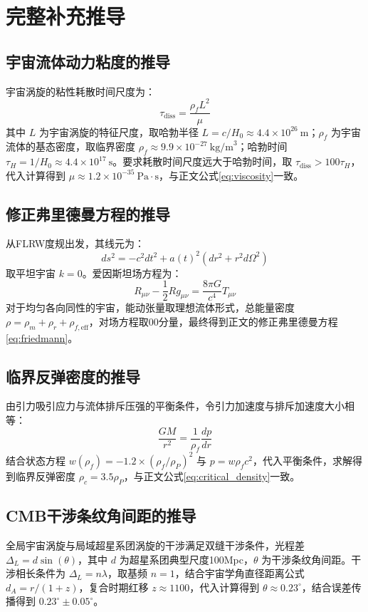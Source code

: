 \documentclass[aps,prd,preprint,superscriptaddress,floatfix,numbers,sort&compress]{revtex4-2}
\begin{document}
\section{完整补充推导}
\subsection{宇宙流体动力粘度的推导}
宇宙涡旋的粘性耗散时间尺度为：
$$\tau_{\text{diss}}=\frac{\rho_{f} L^{2}}{\mu}$$
其中 $L$ 为宇宙涡旋的特征尺度，取哈勃半径 $L=c / H_{0} \approx 4.4 \times 10^{26} \ \text{m}$；$\rho_{f}$ 为宇宙流体的基态密度，取临界密度 $\rho_{f} \approx 9.9 \times 10^{-27} \ \text{kg/m}^3$；哈勃时间 $\tau_{H}=1 / H_{0} \approx 4.4 \times 10^{17} \ \text{s}$。要求耗散时间尺度远大于哈勃时间，取 $\tau_{\text{diss}}>100 \tau_{H}$，代入计算得到 $\mu \approx 1.2 \times 10^{-35} \ \text{Pa} \cdot \text{s}$，与正文公式\eqref{eq:viscosity}一致。

\subsection{修正弗里德曼方程的推导}
从FLRW度规出发，其线元为：
$$ds^{2}=-c^{2} d t^{2}+a(t)^{2}(d r^{2}+r^{2} d \Omega^{2})$$
取平坦宇宙 $k=0$。爱因斯坦场方程为：
$$R_{\mu \nu}-\frac{1}{2} R g_{\mu \nu}=\frac{8 \pi G}{c^{4}} T_{\mu \nu}$$
对于均匀各向同性的宇宙，能动张量取理想流体形式，总能量密度 $\rho=\rho_{m}+\rho_{r}+\rho_{f, \mathrm{eff}}$，对场方程取00分量，最终得到正文的修正弗里德曼方程\eqref{eq:friedmann}。

\subsection{临界反弹密度的推导}
由引力吸引应力与流体排斥压强的平衡条件，令引力加速度与排斥加速度大小相等：
$$\frac{G M}{r^{2}}=\frac{1}{\rho_{f}} \frac{d p}{d r}$$
结合状态方程 $w(\rho_{f})=-1.2 \times(\rho_{f} / \rho_{P})^{2}$ 与 $p=w \rho_{f} c^{2}$，代入平衡条件，求解得到临界反弹密度 $\rho_{c}=3.5 \rho_{P}$，与正文公式\eqref{eq:critical_density}一致。

\subsection{CMB干涉条纹角间距的推导}
全局宇宙涡旋与局域超星系团涡旋的干涉满足双缝干涉条件，光程差 $\Delta_{L}=d \sin (\theta)$，其中 $d$ 为超星系团典型尺度100Mpc，$\theta$ 为干涉条纹角间距。干涉相长条件为 $\Delta_{L}=n \lambda$，取基频 $n=1$，结合宇宙学角直径距离公式 $d_{A}=r /(1+z)$，复合时期红移 $z \approx 1100$，代入计算得到 $\theta \approx 0.23^\circ$，结合误差传播得到 $0.23^\circ \pm 0.05^\circ$。
\end{document}
